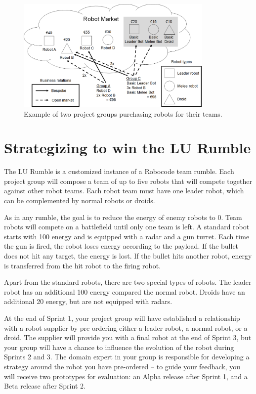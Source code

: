 \documentclass{scrreprt}
\begin{document}
\begin{figure}
\centering
\includegraphics[width=0.85\textwidth]{figures/marketExample.png}
\caption{Example of two project groups purchasing robots for their teams.}
\label{fig:market}
\end{figure}

\section{Strategizing to win the LU Rumble}
The LU Rumble is a customized instance of a Robocode team rumble. Each project group will compose a team of up to five robots that will compete together against other robot teams. Each robot team must have one leader robot, which can be complemented by normal robots or droids.

As in any rumble, the goal is to reduce the energy of enemy robots to 0. Team robots will compete on a battlefield until only one team is left. A standard robot starts with 100 energy and is equipped with a radar and a gun turret. Each time the gun is fired, the robot loses energy according to the payload. If the bullet does not hit any target, the energy is lost. If the bullet hits another robot, energy is transferred from the hit robot to the firing robot.

Apart from the standard robots, there are two special types of robots. The leader robot has an additional 100 energy compared the normal robot. Droids have an additional 20 energy, but are not equipped with radars.

At the end of Sprint 1, your project group will have established a relationship with a robot supplier by pre-ordering either a leader robot, a normal robot, or a droid. The supplier will provide you with a final robot at the end of Sprint 3, but your group will have a chance to influence the evolution of the robot during Sprints 2 and 3. The domain expert in your group is responsible for developing a strategy around the robot you have pre-ordered -- to guide your feedback, you will receive two prototypes for evaluation: an Alpha release after Sprint 1, and a Beta release after Sprint 2.
\end{document}
